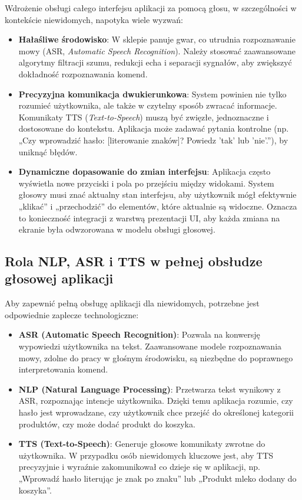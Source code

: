 Wdrożenie obsługi całego interfejsu aplikacji za pomocą głosu, w szczególności w kontekście niewidomych, napotyka wiele wyzwań:

\begin{itemize} \item \textbf{Hałaśliwe środowisko}: W sklepie panuje gwar, co utrudnia rozpoznawanie mowy (ASR, \textit{Automatic Speech Recognition}). Należy stosować zaawansowane algorytmy filtracji szumu, redukcji echa i separacji sygnałów, aby zwiększyć dokładność rozpoznawania komend. \item \textbf{Precyzyjna komunikacja dwukierunkowa}: System powinien nie tylko rozumieć użytkownika, ale także w czytelny sposób zwracać informacje. Komunikaty TTS (\textit{Text-to-Speech}) muszą być zwięzłe, jednoznaczne i dostosowane do kontekstu. Aplikacja może zadawać pytania kontrolne (np. „Czy wprowadzić hasło: [literowanie znaków]? Powiedz 'tak' lub 'nie'.”), by uniknąć błędów. \item \textbf{Dynamiczne dopasowanie do zmian interfejsu}: Aplikacja często wyświetla nowe przyciski i pola po przejściu między widokami. System głosowy musi znać aktualny stan interfejsu, aby użytkownik mógł efektywnie „klikać” i „przechodzić” do elementów, które aktualnie są widoczne. Oznacza to konieczność integracji z warstwą prezentacji UI, aby każda zmiana na ekranie była odwzorowana w modelu obsługi głosowej. \end{itemize}

\subsection{Rola NLP, ASR i TTS w pełnej obsłudze głosowej aplikacji}

Aby zapewnić pełną obsługę aplikacji dla niewidomych, potrzebne jest odpowiednie zaplecze technologiczne:

\begin{itemize} \item \textbf{ASR (Automatic Speech Recognition)}: Pozwala na konwersję wypowiedzi użytkownika na tekst. Zaawansowane modele rozpoznawania mowy, zdolne do pracy w głośnym środowisku, są niezbędne do poprawnego interpretowania komend. \item \textbf{NLP (Natural Language Processing)}: Przetwarza tekst wynikowy z ASR, rozpoznając intencje użytkownika. Dzięki temu aplikacja rozumie, czy hasło jest wprowadzane, czy użytkownik chce przejść do określonej kategorii produktów, czy może dodać produkt do koszyka. \item \textbf{TTS (Text-to-Speech)}: Generuje głosowe komunikaty zwrotne do użytkownika. W przypadku osób niewidomych kluczowe jest, aby TTS precyzyjnie i wyraźnie zakomunikował co dzieje się w aplikacji, np. „Wprowadź hasło literując je znak po znaku” lub „Produkt mleko dodany do koszyka”. \end{itemize}

